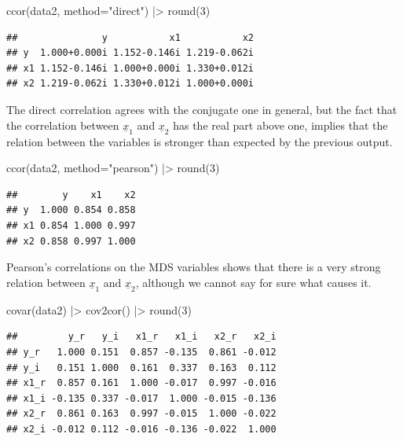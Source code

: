\documentclass[
]{book}
\newenvironment{Shaded}{\begin{snugshade}}{\end{snugshade}}
\newcommand{\AttributeTok}[1]{\textcolor[rgb]{0.77,0.63,0.00}{#1}}
\newcommand{\DecValTok}[1]{\textcolor[rgb]{0.00,0.00,0.81}{#1}}
\newcommand{\FunctionTok}[1]{\textcolor[rgb]{0.00,0.00,0.00}{#1}}
\newcommand{\NormalTok}[1]{#1}
\newcommand{\SpecialCharTok}[1]{\textcolor[rgb]{0.00,0.00,0.00}{#1}}
\newcommand{\StringTok}[1]{\textcolor[rgb]{0.31,0.60,0.02}{#1}}
\begin{document}
\begin{Shaded}
\begin{Highlighting}[]
\FunctionTok{ccor}\NormalTok{(data2, }\AttributeTok{method=}\StringTok{"direct"}\NormalTok{) }\SpecialCharTok{|\textgreater{}} \FunctionTok{round}\NormalTok{(}\DecValTok{3}\NormalTok{)}
\end{Highlighting}
\end{Shaded}

\begin{verbatim}
##               y           x1           x2
## y  1.000+0.000i 1.152-0.146i 1.219-0.062i
## x1 1.152-0.146i 1.000+0.000i 1.330+0.012i
## x2 1.219-0.062i 1.330+0.012i 1.000+0.000i
\end{verbatim}

The direct correlation agrees with the conjugate one in general, but the fact that the correlation between \(\underline{x}_{1}\) and \(\underline{x}_{2}\) has the real part above one, implies that the relation between the variables is stronger than expected by the previous output.

\begin{Shaded}
\begin{Highlighting}[]
\FunctionTok{ccor}\NormalTok{(data2, }\AttributeTok{method=}\StringTok{"pearson"}\NormalTok{) }\SpecialCharTok{|\textgreater{}} \FunctionTok{round}\NormalTok{(}\DecValTok{3}\NormalTok{)}
\end{Highlighting}
\end{Shaded}

\begin{verbatim}
##        y    x1    x2
## y  1.000 0.854 0.858
## x1 0.854 1.000 0.997
## x2 0.858 0.997 1.000
\end{verbatim}

Pearson's correlations on the MDS variables shows that there is a very strong relation between \(\underline{x}_{1}\) and \(\underline{x}_{2}\), although we cannot say for sure what causes it.

\begin{Shaded}
\begin{Highlighting}[]
\FunctionTok{covar}\NormalTok{(data2) }\SpecialCharTok{|\textgreater{}} \FunctionTok{cov2cor}\NormalTok{() }\SpecialCharTok{|\textgreater{}} \FunctionTok{round}\NormalTok{(}\DecValTok{3}\NormalTok{)}
\end{Highlighting}
\end{Shaded}

\begin{verbatim}
##         y_r   y_i   x1_r   x1_i   x2_r   x2_i
## y_r   1.000 0.151  0.857 -0.135  0.861 -0.012
## y_i   0.151 1.000  0.161  0.337  0.163  0.112
## x1_r  0.857 0.161  1.000 -0.017  0.997 -0.016
## x1_i -0.135 0.337 -0.017  1.000 -0.015 -0.136
## x2_r  0.861 0.163  0.997 -0.015  1.000 -0.022
## x2_i -0.012 0.112 -0.016 -0.136 -0.022  1.000
\end{verbatim}
\end{document}
